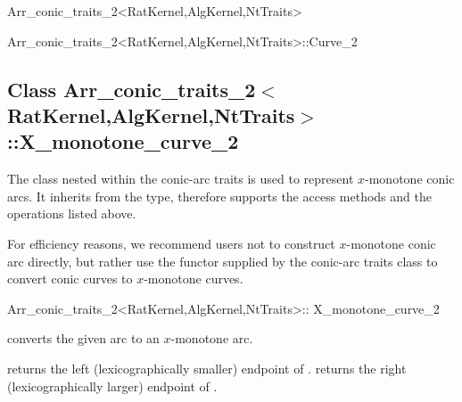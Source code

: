 \begin{ccRefClass}{Arr_conic_traits_2<RatKernel,AlgKernel,NtTraits>}
\begin{ccClass}{Arr_conic_traits_2<RatKernel,AlgKernel,NtTraits>::Curve_2}
\end{ccClass}

\subsection*{Class 
Arr\_conic\_traits\_2$<$RatKernel,AlgKernel,NtTraits$>$::X\_monotone\_curve\_2}

The  class nested within the conic-arc traits is
used to represent $x$-monotone conic arcs. It inherits from the 
type, therefore supports the access methods and the operations listed above.

For efficiency reasons, we recommend users not to construct $x$-monotone
conic arc directly, but rather use the  functor
supplied by the conic-arc traits class to convert conic curves to
$x$-monotone curves.

\begin{ccClass}{Arr_conic_traits_2<RatKernel,AlgKernel,NtTraits>::
                X_monotone_curve_2}

\ccCreation
{}

    {converts the given arc to an $x$-monotone arc.
     }

\ccAccessFunctions

  {returns the left (lexicographically smaller) endpoint of \ccVar{}.}
\ccGlue
{}
  {returns the right (lexicographically larger) endpoint of \ccVar{}.}

\end{ccClass}

\end{ccRefClass}

\ccRefPageEnd
